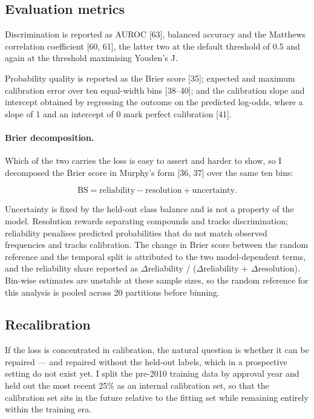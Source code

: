 \documentclass[pdflatex,sn-basic,Numbered,referee,lineno]{sn-jnl}%
\theoremstyle{thmstyleone}%
\theoremstyle{thmstyletwo}%
\theoremstyle{thmstylethree}%
\begin{document}
\subsection{Evaluation metrics}

Discrimination is reported as AUROC [63], balanced accuracy and the Matthews correlation coefficient [60, 61], the latter two at the default threshold of 0.5 and again at the threshold maximising Youden's J.

Probability quality is reported as the Brier score [35]; expected and maximum calibration error over ten equal-width bins [38--40]; and the calibration slope and intercept obtained by regressing the outcome on the predicted log-odds, where a slope of 1 and an intercept of 0 mark perfect calibration [41].

\paragraph{Brier decomposition.}
Which of the two carries the loss is easy to assert and harder to show, so I decomposed the Brier score in Murphy's form [36, 37] over the same ten bins:

\begin{equation}
\mathrm{BS} = \mathrm{reliability} - \mathrm{resolution} + \mathrm{uncertainty}.
\end{equation}

Uncertainty is fixed by the held-out class balance and is not a property of the model. Resolution rewards separating compounds and tracks discrimination; reliability penalises predicted probabilities that do not match observed frequencies and tracks calibration. The change in Brier score between the random reference and the temporal split is attributed to the two model-dependent terms, and the reliability share reported as $\Delta$reliability / ($\Delta$reliability + $\Delta$resolution). Bin-wise estimates are unstable at these sample sizes, so the random reference for this analysis is pooled across 20 partitions before binning.

\subsection{Recalibration}

If the loss is concentrated in calibration, the natural question is whether it can be repaired --- and repaired without the held-out labels, which in a prospective setting do not exist yet. I split the pre-2010 training data by approval year and held out the most recent 25\% as an internal calibration set, so that the calibration set sits in the future relative to the fitting set while remaining entirely within the training era.
\end{document}
